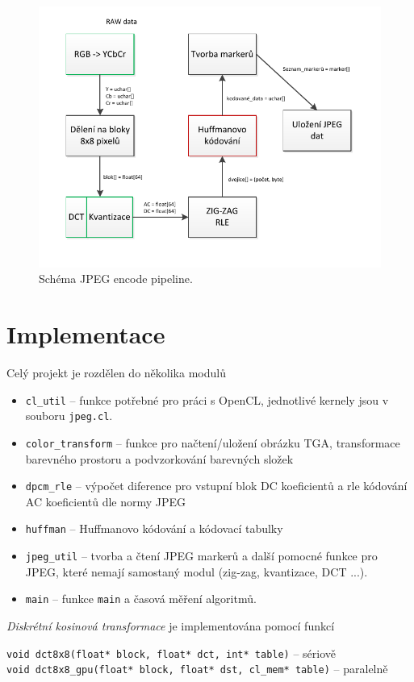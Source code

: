 \documentclass[11pt,a4paper]{article}
\begin{document}
\begin{figure}[H]
  \centering
  \includegraphics[width=15cm]{pipeline.pdf}
  \caption{Schéma JPEG encode pipeline.}
  \label{pipeline}
\end{figure}

\section{Implementace}
Celý projekt je rozdělen do několika modulů
\begin{itemize}
\item \texttt{cl\_util} -- funkce potřebné pro práci s OpenCL, jednotlivé kernely jsou v souboru \texttt{jpeg.cl}.
\item \texttt{color\_transform} -- funkce pro načtení/uložení obrázku TGA, transformace barevného prostoru a podvzorkování barevných složek 
\item \texttt{dpcm\_rle} -- výpočet diference pro vstupní blok DC koeficientů a rle kódování AC koeficientů dle normy JPEG
\item \texttt{huffman} -- Huffmanovo kódování a kódovací tabulky
\item \texttt{jpeg\_util} -- tvorba a čtení JPEG markerů a další pomocné funkce pro JPEG, které nemají samostaný
modul (zig-zag, kvantizace, DCT ...).
\item \texttt{main} -- funkce \texttt{main} a časová měření algoritmů.
\end{itemize}
\textit{Diskrétní kosinová transformace} je implementována pomocí funkcí

\vspace{0.5em}
\hspace{-1.5em}\texttt{void dct8x8(float* block, float* dct, int* table)} -- sériově\\
\texttt{void dct8x8\_gpu(float* block, float* dst, cl\_mem* table)} -- paralelně
\vspace{0.5em}
\end{document}
